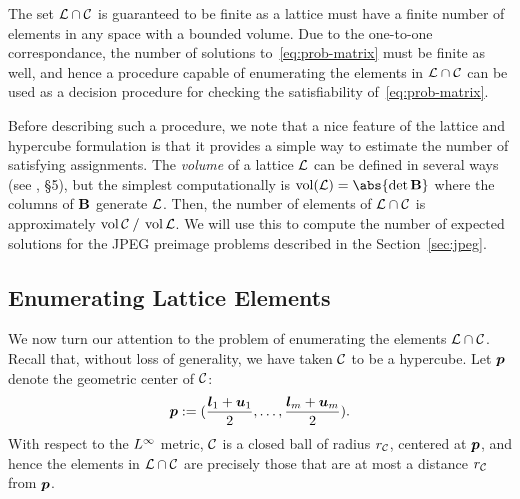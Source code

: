 The set $\mathcal{L} \cap \mathcal{C}$ is guaranteed to be finite as a
lattice must have a finite number of elements in any space with
a bounded volume.
%
Due to the one-to-one correspondance, the number of
solutions to~\eqref{eq:prob-matrix} must be finite as well, and
hence a procedure capable of enumerating the elements in $\mathcal{L} \cap \mathcal{C}$ can
be used as a decision procedure for checking the satisfiability
of~\eqref{eq:prob-matrix}.

Before describing such a procedure, we note that a nice feature
of the lattice and hypercube formulation is that it provides
a simple way to estimate the number of satisfying assignments. The
\emph{volume} of a lattice $\mathcal{L}$ can be defined in several ways (see
\cite{Lenstra}, \S5), but the simplest computationally is $\vol(\La) =
\abs{\det{\m{B}}}$ where the columns of $\mathbf{B}$ generate $\mathcal{L}$. Then, the
number of elements of $\mathcal{L} \cap \mathcal{C}$ is approximately
$\operatorname{vol}{\mathcal{C}}\:{/}\:\operatorname{vol}{\mathcal{L}}$.
We will
use this to compute the number of expected solutions for the JPEG preimage
problems described in the Section~\ref{sec:jpeg}.




\subsection{Enumerating Lattice Elements}
\label{ssec:dp}


%
%

We now turn our attention to the problem of enumerating the elements
$\mathcal{L} \cap \mathcal{C}$.  Recall that, without loss of generality, we have
taken $\mathcal{C}$ to be a hypercube. Let $\boldsymbol{p}$ denote the geometric center
of $\mathcal{C}$:
%
\begin{equation}
    \label{eq:center}
    \boldsymbol{p} := (\frac{\boldsymbol{l}_1 + \boldsymbol{u}_1}{2}, \ldots, \frac{\boldsymbol{l}_m + \boldsymbol{u}_m}{2}).
\end{equation}
With respect to the $L^\infty$ metric, $\mathcal{C}$ is a closed ball of radius $r_{\mathcal{C}}$,
centered at $\boldsymbol{p}$, and hence the elements in $\mathcal{L} \cap \mathcal{C}$ are
precisely those that are at most a distance $r_{\mathcal{C}}$ from $\boldsymbol{p}$.

